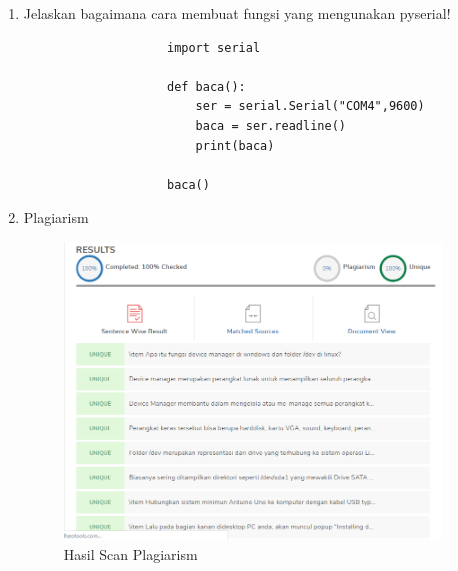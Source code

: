 \begin{enumerate}
			\item Jelaskan bagaimana cara membuat fungsi yang mengunakan pyserial!
				\begin{verbatim}			
					import serial

					def baca():
						ser = serial.Serial("COM4",9600)
						baca = ser.readline()
						print(baca)

					baca()
				\end{verbatim}
				
			\item Plagiarism
			\begin{figure}[H]
				\includegraphics[width=10cm]{figures/5/1174050/Teori/plagiarism.png}
				\centering
				\caption{Hasil Scan Plagiarism}
			\end{figure}
			
		\end{enumerate}
